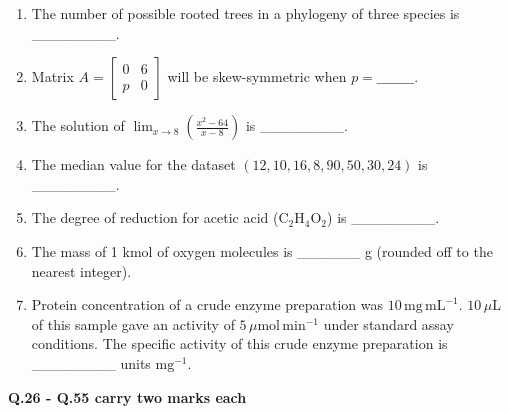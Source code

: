 \documentclass[12pt]{article}
\begin{document}
\begin{enumerate}[label=Q.\arabic*]
	\item The number of possible rooted trees in a phylogeny of three species is \_\_\_\_\_\_\_\_.

	\item Matrix \( A = \begin{bmatrix} 0 & 6 \\ p & 0 \end{bmatrix} \) will be skew-symmetric when \( p = \_\_\_\_\_\_\_\_ \).
		\item The solution of \( \lim_{x \to 8} \left( \frac{x^2 - 64}{x - 8} \right) \) is \_\_\_\_\_\_\_\_.

		\item The median value for the dataset \( (12, 10, 16, 8, 90, 50, 30, 24) \) is \_\_\_\_\_\_\_\_.

		\item The degree of reduction for acetic acid (\(\mathrm{C_2H_4O_2}\)) is \_\_\_\_\_\_\_\_.

		\item The mass of 1 kmol of oxygen molecules is \_\_\_\_\_\_ g (rounded off to the nearest integer).
		\item Protein concentration of a crude enzyme preparation was \(10\, \mathrm{mg\, mL^{-1}}\). \(10\, \mu\mathrm{L}\) of this sample gave an activity of \(5\, \mu\mathrm{mol\, min^{-1}}\) under standard assay conditions. The specific activity of this crude enzyme preparation is \_\_\_\_\_\_\_\_ units \( \mathrm{mg^{-1}} \).
\end{enumerate}
\textbf{Q.26 - Q.55 carry two marks each}
\end{document}
